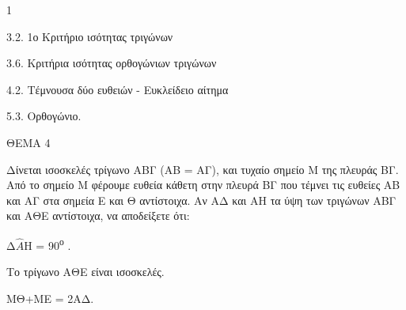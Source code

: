 \begin{ylh}{1}
    \item 3.2. 1ο Κριτήριο ισότητας τριγώνων
    \item 3.6. Κριτήρια ισότητας ορθογώνιων τριγώνων
    \item 4.2. Τέμνουσα δύο ευθειών - Ευκλείδειο αίτημα
    \item 5.3. Ορθογώνιο.
\end{ylh}

ΘΕΜΑ 4

Δίνεται ισοσκελές τρίγωνο ΑΒΓ (ΑΒ = ΑΓ), και τυχαίο σημείο Μ της πλευράς ΒΓ. Από το σημείο Μ φέρουμε ευθεία κάθετη στην πλευρά ΒΓ που τέμνει τις ευθείες ΑΒ και ΑΓ στα σημεία Ε και Θ αντίστοιχα. Αν ΑΔ και ΑΗ τα ύψη των τριγώνων ΑΒΓ και ΑΘΕ αντίστοιχα, να αποδείξετε ότι:

\begin{alist}
\item Δ$\widehat{A}$Η = 90\textsuperscript{ο} . 

\item Το τρίγωνο ΑΘΕ είναι ισοσκελές. 

\item ΜΘ+ΜΕ = 2ΑΔ. 


\begin{center}
\end{center}
\end{alist}

